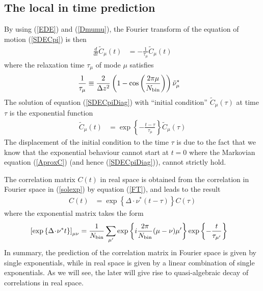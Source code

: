 \documentclass[b5paper,openright,10pt]{book}
\newcommand{\esc}{\!\cdot\!}
\begin{document}


\subsection{The local in time prediction}
By using (\ref{EDE})  and (\ref{Dmumu}), the Fourier  transform of the
equation of motion (\ref{SDECpi}) is then
\begin{align}
  \frac{d}{dt}\tilde{C}_{\mu}(t)&=-\frac{1}{\tau_\mu}\tilde{C}_\mu(t)  
\label{SDECpiDiag}
\end{align}
where the relaxation time $\tau_\mu$ of mode $\mu$ satisfies
\begin{align}
 \frac{1}{\tau_\mu}&\equiv \frac{2}{\Delta z^2}
\left(1-\cos\left( \frac{2\pi \mu}{N_{\rm bin}}\right)\right)
\tilde{\nu}_\mu^*
\label{taumu}
\end{align}
The  solution of  equation  (\ref{SDECpiDiag})  with ``initial  condition''
$\tilde{C}_\mu(\tau)$ at time $\tau$ is the exponential function
\begin{align}
  \tilde{C}_\mu(t)&=\exp\left\{-\frac{t-\tau}{\tau_\mu}\right\}  \tilde{C}_\mu(\tau)
\label{solexp}
\end{align}
The displacement of the initial condition to the time $\tau$ is due to
the fact that  we know that the exponential behaviour  cannot start at
$t=0$  where   the  Markovian  equation  (\ref{AproxC})   (and  hence
(\ref{SDECpiDiag})), cannot strictly hold.

The correlation matrix $C(t)$ in real space is obtained from the correlation in Fourier space in (\ref{solexp}) by equation (\ref{FT}), and leads to the result
\begin{align}
  C(t)&=\exp\left\{\Delta\esc \nu^* (t-\tau) \right\}C(\tau)
\label{Cmunut}
\end{align}
where the exponential matrix takes the form
\begin{align}
\left[\exp\left\{\Delta\esc \nu^* t \right\}\right]_{\mu\nu}
&=\frac{1}{N_{\rm bin}}\sum_{\mu'}\exp\left\{i\frac{2\pi}{N_{\rm bin}}(\mu-\nu)\mu'\right\}
\exp\left\{-\frac{t}{\tau_{\mu'}}\right\}
\label{ExpMat}
\end{align}
In summary, the prediction of  the correlation matrix in Fourier space
is given  by single exponentials,  while in real  space is given  by a
linear combination of  single exponentials. As we will  see, the later
will give rise to quasi-algebraic decay of correlations in real space.
\end{document}
